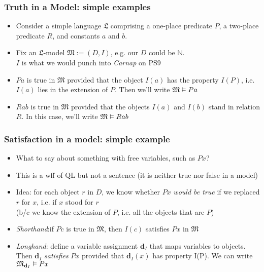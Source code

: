 \begin{frame}
\frametitle{Truth in a Model: simple examples}

\begin{itemize}[<+->]

\item Consider a simple language $\mathfrak{L}$ comprising a one-place predicate $P$, a two-place predicate $R$, and constants $a$ and $b$. 

\item Fix an $\mathfrak{L}$-model $\mathfrak{M} := (D, I)$, e.g. our $D$ could be $\mathbb{N}$. \\ $I$ is what we would punch into \textit{Carnap} on PS9

\item $Pa$ is true in $\mathfrak{M}$ provided that the object $I(a)$ has the property $I(P)$, i.e. $I(a)$ lies in the extension of $P$. Then we'll write $\mathfrak{M} \vDash Pa$

\item $Rab$ is true in $\mathfrak{M}$ provided that the objects $I(a)$ and $I(b)$ stand in relation $R$. In this case, we'll write $\mathfrak{M} \vDash Rab$

\end{itemize}
\end{frame}

\begin{frame}
\frametitle{Satisfaction in a model: simple example}

\begin{itemize}[<+->]

\item What to say about something with free variables, such as $Px$?

\item This is a wff of QL but not a sentence (it is neither true nor false in a model)

\item Idea: for each object $r$ in $D$, we know whether $Px$ \textit{would be true} if we replaced $r$ for $x$, i.e. if $x$ stood for $r$ \\ (b/c we know the extension of $P$, i.e. all the objects that are $P$)

\item \textit{Shorthand}:if $Pc$ is true in $\mathfrak{M}$, then $I(c)$ \alert{satisfies} $Px$ in $\mathfrak{M}$

\item \textit{Longhand}: define a variable assignment $\mathbf{d}_I$ that maps variables to objects. Then $\mathbf{d}_I$ \emph{satisfies} $Px$ provided that $\mathbf{d}_I (x)$ has property I(P). We can write $\mathfrak{M}_{\mathbf{d}_I} \vDash Px$

\end{itemize}
\end{frame}

